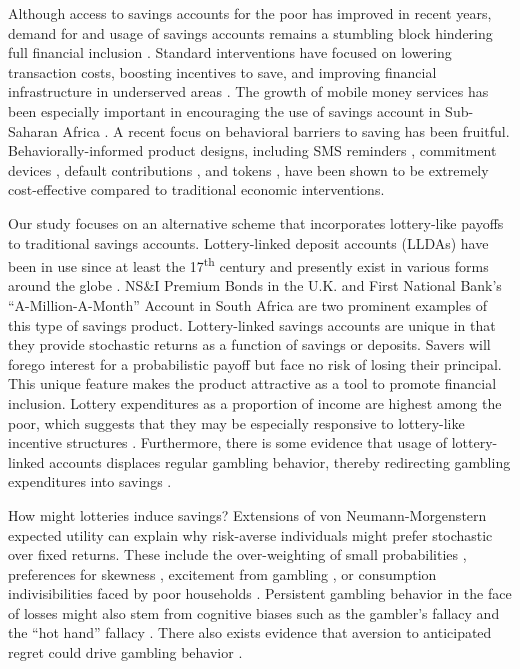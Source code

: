\documentclass[10pt]{article}
\begin{document}
	Although access to savings accounts for the poor has improved in recent years, demand for and usage of savings accounts remains a stumbling block hindering full financial inclusion . Standard interventions have focused on lowering transaction costs, boosting incentives to save, and improving financial infrastructure in underserved areas . The growth of mobile money services has been especially important in encouraging the use of savings account in Sub-Saharan Africa . A recent focus on behavioral barriers to saving has been fruitful. Behaviorally-informed product designs, including SMS reminders , commitment devices , default contributions , and tokens , have been shown to be extremely cost-effective compared to traditional economic interventions.
	
	Our study focuses on an alternative scheme that incorporates lottery-like payoffs to traditional savings accounts. Lottery-linked deposit accounts (LLDAs) have been in use since at least the 17\textsuperscript{th} century and presently exist in various forms around the globe . NS\&I Premium Bonds in the U.K. and First National Bank's ``A-Million-A-Month'' Account in South Africa are two prominent examples of this type of savings product. Lottery-linked savings accounts are unique in that they provide stochastic returns as a function of savings or deposits. Savers will forego interest for a probabilistic payoff but face no risk of losing their principal. This unique feature makes the product attractive as a tool to promote financial inclusion. Lottery expenditures as a proportion of income are highest among the poor, which suggests that they may be especially responsive to lottery-like incentive structures . Furthermore, there is some evidence that usage of lottery-linked accounts displaces regular gambling behavior, thereby redirecting gambling expenditures into savings .

	How might lotteries induce savings? Extensions of von Neumann-Morgenstern expected utility can explain why risk-averse individuals might prefer stochastic over fixed returns. These include the over-weighting of small probabilities , preferences for skewness , excitement from gambling , or consumption indivisibilities faced by poor households . Persistent gambling behavior in the face of losses might also stem from cognitive biases such as the gambler's fallacy and the ``hot hand'' fallacy . There also exists evidence that aversion to anticipated regret could drive gambling behavior .
\end{document}
